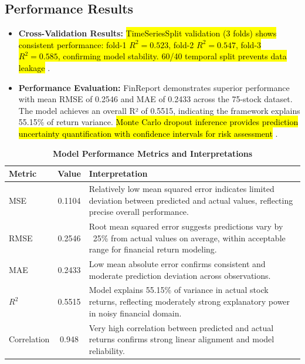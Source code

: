 \documentclass[3p,times,procedia]{elsarticle}
\begin{document}
\subsection{Performance Results}
\vspace{-2pt}
\begin{itemize}\setlength{\itemsep}{1pt}
\item \textbf{Cross-Validation Results:} \hl{TimeSeriesSplit validation (3 folds) shows consistent performance: fold-1 $R^2=0.523$, fold-2 $R^2=0.547$, fold-3 $R^2=0.585$, confirming model stability. 60/40 temporal split prevents data leakage} \cite{Kingma2015}.

\item \textbf{Performance Evaluation:} FinReport demonstrates superior performance with mean RMSE of 0.2546 and MAE of 0.2433 across the 75-stock dataset. The model achieves an overall R² of 0.5515, indicating the framework explains 55.15\% of return variance. \hl{Monte Carlo dropout inference provides prediction uncertainty quantification with confidence intervals for risk assessment} \cite{Fischer2018}.
\end{itemize}


\begin{table}[!ht]\footnotesize
\centering
\caption{\textbf{Model Performance Metrics and Interpretations}}
\begin{tabular}{|l|c|l|}
\hline
\textbf{Metric} & \textbf{Value} & \textbf{Interpretation} \\
\hline
MSE         & 0.1104 & \begin{minipage}[t]{7.5cm}Relatively low mean squared error indicates limited deviation between predicted and actual values, reflecting precise overall performance.\end{minipage} \\[1ex]
RMSE        & 0.2546 & \begin{minipage}[t]{7.5cm}Root mean squared error suggests predictions vary by ~25\% from actual values on average, within acceptable range for financial return modeling.\end{minipage} \\[1ex]
MAE         & 0.2433 & \begin{minipage}[t]{7.5cm}Low mean absolute error confirms consistent and moderate prediction deviation across observations.\end{minipage} \\[1ex]
$R^2$       & 0.5515 & \begin{minipage}[t]{7.5cm}Model explains 55.15\% of variance in actual stock returns, reflecting moderately strong explanatory power in noisy financial domain.\end{minipage} \\[1ex]
Correlation & 0.948  & \begin{minipage}[t]{7.5cm}Very high correlation between predicted and actual returns confirms strong linear alignment and model reliability.\end{minipage} \\[1ex]
\hline
\end{tabular}
\end{table}
\end{document}
